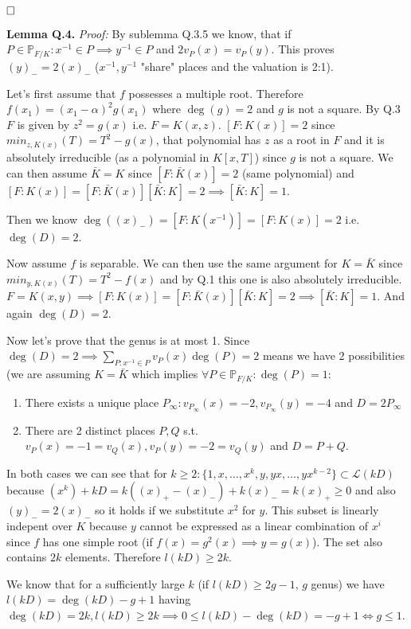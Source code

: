 \documentclass[12pt, a4paper]{article}
\newcommand{\qed}{\hfill\square}
\begin{document}
$\qed$

\textbf{Lemma Q.4.} \textit{Proof:}
By sublemma Q.3.5 we know, that if $P \in \mathbb{P}_{F/K}: x^{-1} \in P \implies y^{-1} \in P$ and $2v_P(x)=v_P(y)$. This proves $(y)_{-}=2(x)_{-}$ ($x^{-1},y^{-1}$ "share" places and the valuation is 2:1).

Let's first assume that $f$ possesses a multiple root. Therefore $f(x_1) = (x_1-\alpha)^2g(x_1)$ where $\deg(g) = 2$ and $g$ is not a square. By Q.3 $F$ is given by $z^2 = g(x)$ i.e. $F=K(x,z)$. $[F:K(x)]=2$ since $min_{z,K(x)}(T) = T^2 - g(x)$, that polynomial has $z$ as a root in $F$ and it is absolutely irreducible (as a polynomial in $K[x,T]$) since $g$ is not a square. We can then assume $\bar{K}=K$ since $[F:\bar{K}(x)] = 2$ (same polynomial) and $[F:K(x)] = [F:\bar{K}(x)][\bar{K}:K] = 2 \implies [\bar{K}:K] = 1$.

Then we know $\deg((x)_{-}) = [F:K(x^{-1})] = [F:K(x)] = 2$ i.e. $\deg(D)=2$.

Now assume $f$ is separable. We can then use the same argument for $K=\bar{K}$ since $min_{y,K(x)}(T) = T^2-f(x)$ and by Q.1 this one is also absolutely irreducible. $F=K(x,y) \implies [F:K(x)] = [F:\bar{K}(x)][\bar{K}:K] = 2 \implies [\bar{K}:K]=1$. And again $\deg(D)=2$.

Now let's prove that the genus is at most 1. Since $\deg(D)=2 \implies \sum\limits_{P: x^{-1}\in P} v_P(x)\deg(P) = 2$ means we have 2 possibilities (we are assuming $K=\bar{K}$ which implies $\forall P \in \mathbb{P}_{F/K}: \deg(P)=1$:
\begin{enumerate}
    \item There exists a unique place $P_\infty: v_{P_\infty}(x)=-2, v_{P_\infty}(y)=-4$ and $D = 2P_\infty$
    \item There are 2 distinct places $P,Q$ s.t. $v_P(x)=-1=v_Q(x), v_P(y)=-2=v_Q(y)$ and $D = P + Q$.
\end{enumerate}

In both cases we can see that for $k \geq 2: \{1,x,\dots,x^k, y, yx, \dots, yx^{k-2}\} \subset \mathcal{L}(kD)$ because $(x^k) + kD = k((x)_{+}-(x)_{-})+k(x)_{-} = k(x)_{+} \geq 0$ and also $(y)_{-}=2(x)_{-}$ so it holds if we substitute $x^2$ for $y$. This subset is linearly indepent over $K$ because $y$ cannot be expressed as a linear combination of $x^i$ since $f$ has one simple root (if $f(x)=g^2(x) \implies y=g(x)$). The set also contains $2k$ elements. Therefore $l(kD) \geq 2k$. 

We know that for a sufficiently large $k$ (if $l(kD) \geq 2g-1$, $g$ genus) we have $l(kD) = \deg(kD)-g+1$ having $\deg(kD)=2k, l(kD) \geq 2k \implies 0 \leq l(kD)-\deg(kD) = -g + 1 \iff g \leq 1$.
\end{document}
